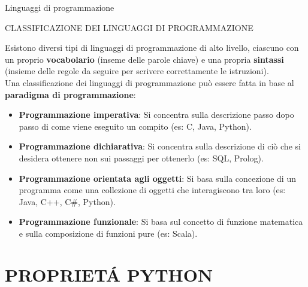 \documentclass[aspectratio=1610, handout]{beamer}
\begin{document}
\begin{frame}{Linguaggi di programmazione}
    \begin{alertblock}{CLASSIFICAZIONE DEI LINGUAGGI DI PROGRAMMAZIONE}
        \begin{minipage}{0.98\linewidth}
            \justifying
            Esistono diversi tipi di linguaggi di programmazione di alto livello, ciascuno 
            con un proprio \textbf{vocabolario} (inseme delle parole chiave) e una propria 
            \textbf{sintassi} (insieme delle regole da seguire per scrivere correttamente le istruzioni).\\ 
            Una classificazione dei linguaggi di programmazione può essere fatta in base al 
            \textbf{paradigma di programmazione}:      
            \begin{itemize}
                \pause
                \item \textbf{Programmazione imperativa}: Si concentra sulla descrizione passo dopo 
                passo di come viene eseguito un compito (es: C, Java, Python).
                \pause
                \item \textbf{Programmazione dichiarativa}: Si concentra sulla descrizione di ciò che si 
                desidera ottenere non sui passaggi per ottenerlo (es: SQL, Prolog).
                \pause
                \item \textbf{Programmazione orientata agli oggetti}: Si basa sulla concezione di un 
                programma come una collezione di oggetti che interagiscono tra loro (es: Java, C++, C\#, Python).
                \pause
                \item \textbf{Programmazione funzionale}: Si basa sul concetto di funzione matematica e 
                sulla composizione di funzioni pure (es: Scala).
            \end{itemize}
        \end{minipage}
    \end{alertblock}
\end{frame}

\section{PROPRIET\'A PYTHON}
\end{document}
